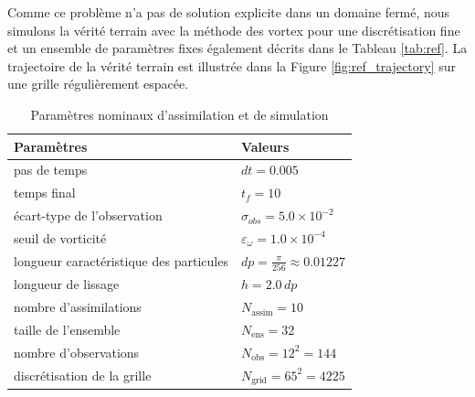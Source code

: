 Comme ce problème n'a pas de solution explicite dans un domaine fermé, nous simulons la vérité terrain avec la méthode des vortex pour une discrétisation fine et un ensemble de paramètres fixes également décrits dans le Tableau \ref{tab:ref}. La trajectoire de la vérité terrain est illustrée dans la Figure \ref{fig:ref_trajectory} sur une grille régulièrement espacée.

\begin{table}[htbp]
    \centering
    \caption{Paramètres nominaux d'assimilation et de simulation}
    \begin{tabular}[t]{|l|l|}
        \hline
        Paramètres                              & Valeurs                                     \\
        \hline
        pas de temps                            & $dt = 0.005$                                \\
        temps final                             & $t_f = 10$                                  \\
        écart-type de l'observation             & $\sigma_{obs} =  5.0 \times 10^{-2}$        \\
        seuil de vorticité                      & $\varepsilon_{\omega} = 1.0 \times 10^{-4}$ \\
        longueur caractéristique des particules & $dp = \frac{\pi}{256} \approx 0.01227 $     \\
        longueur de lissage                     & $h = 2.0 \, dp$                             \\
        nombre d'assimilations                  & $N_{\text{assim}} = 10$                     \\
        taille de l'ensemble                    & $N_{\text{ens}} = 32$                       \\
        nombre d'observations                   & $N_{\text{obs}} = 12^2 = 144$               \\
        discrétisation de la grille             & $N_{\text{grid}} = 65^2 = 4225$             \\
        \hline
    \end{tabular}
    \label{tab:simu_2d}
\end{table}

